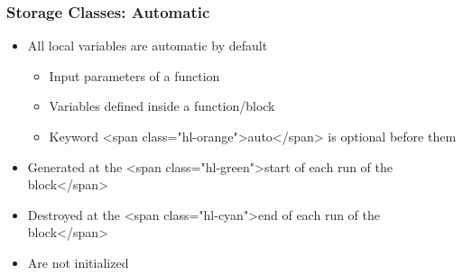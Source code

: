 \documentclass{../c-lecture}
\begin{document}
\begin{frame}
  \frametitle{Storage Classes: Automatic}
  \begin{itemize}
    \item All local variables are automatic by default
    \begin{itemize}
      \item Input parameters of a function
      \item Variables defined inside a function/block
      \item
        Keyword <span class="hl-orange">auto</span> is optional before them
    \end{itemize}
    \item
      Generated at the
      <span class="hl-green">start of each run of the block</span>

    \item
      Destroyed at the
      <span class="hl-cyan">end of each run of the block</span>

    \item Are not initialized
  \end{itemize}
\end{frame}
\end{document}
